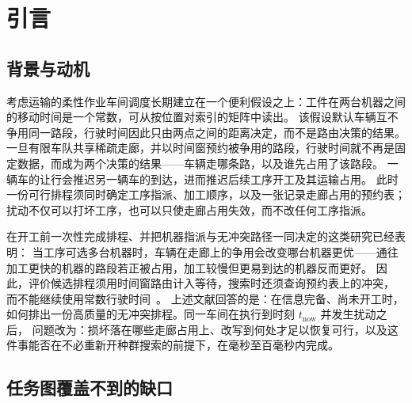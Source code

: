 \documentclass[manuscript,screen,review]{acmart}
\begin{document}


\maketitle

\section{引言}
\label{sec:introduction}

\subsection{背景与动机}

考虑运输的柔性作业车间调度长期建立在一个便利假设之上：工件在两台机器之间的移动时间是一个常数，可从按位置对索引的矩阵中读出。
该假设默认车辆互不争用同一路段，行驶时间因此只由两点之间的距离决定，而不是路由决策的结果。
一旦有限车队共享稀疏走廊，并以时间窗预约被争用的路段，行驶时间就不再是固定数据，而成为两个决策的结果——车辆走哪条路，以及谁先占用了该路段。
一辆车的让行会推迟另一辆车的到达，进而推迟后续工序开工及其运输占用。
此时一份可行排程须同时确定工序指派、加工顺序，以及一张记录走廊占用的预约表；扰动不仅可以打坏工序，也可以只使走廊占用失效，而不改任何工序指派。

在开工前一次性完成排程、并把机器指派与无冲突路径一同决定的这类研究已经表明：
当工序可选多台机器时，车辆在走廊上的争用会改变哪台机器更优——通往加工更快的机器的路段若正被占用，加工较慢但更易到达的机器反而更好。
因此，评价候选排程须用时间窗路由计入等待，搜索时还须查询预约表上的冲突，
而不能继续使用常数行驶时间~\cite{vanos2026exact,li2026framework,sun2023integrated}。
上述文献回答的是：在信息完备、尚未开工时，如何排出一份高质量的无冲突排程。同一车间在执行到时刻 \(t_{\mathrm{now}}\) 并发生扰动之后，
问题改为：损坏落在哪些走廊占用上、改写到何处才足以恢复可行，以及这件事能否在不必重新开种群搜索的前提下，在毫秒至百毫秒内完成。

\subsection{任务图覆盖不到的缺口}
\end{document}
